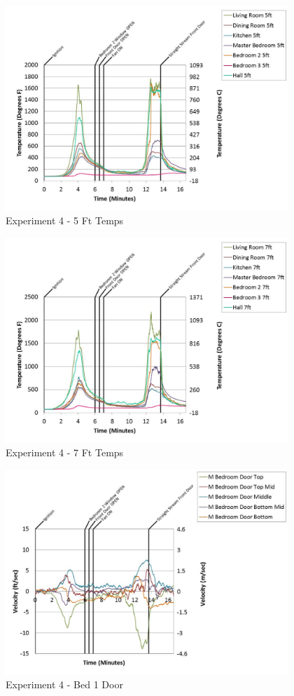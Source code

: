 \documentclass{article}
\begin{document}
\begin{appendices}
	\begin{figure}[h!]
		\centering
		\includegraphics[height=3.05in]{0_Images/Results_Charts/Exp_4_Charts/5FtTemps.pdf}
		\caption{Experiment 4 - 5 Ft Temps}
	\end{figure}
 

	\begin{figure}[h!]
		\centering
		\includegraphics[height=3.05in]{0_Images/Results_Charts/Exp_4_Charts/7FtTemps.pdf}
		\caption{Experiment 4 - 7 Ft Temps}
	\end{figure}
 
	\clearpage

	\begin{figure}[h!]
		\centering
		\includegraphics[height=3.05in]{0_Images/Results_Charts/Exp_4_Charts/Bed1Door.pdf}
		\caption{Experiment 4 - Bed 1 Door}
	\end{figure}
 


\end{appendices}
\end{document}
